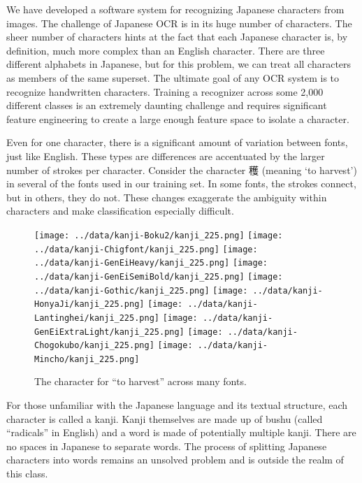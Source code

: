\documentclass[10pt,twocolumn,letterpaper]{article}
\begin{document}
We have developed a software system for recognizing Japanese characters from images. The challenge of Japanese OCR is in its huge number of characters. The sheer number of characters hints at the fact that each Japanese character is, by definition, much more complex than an English character. There are three different alphabets in Japanese, but for this problem, we can treat all characters as members of the same superset. The ultimate goal of any OCR system is to recognize handwritten characters. Training a recognizer across some 2,000 different classes is an extremely daunting challenge and requires significant feature engineering to create a large enough feature space to isolate a character.

Even for one character, there is a significant amount of variation between fonts, just like English. These types are differences are accentuated by the larger number of strokes per character. Consider the character 穫 (meaning ‘to harvest’) in several of the fonts used in our training set. In some fonts, the strokes connect, but in others, they do not. These changes exaggerate the ambiguity within characters and make classification especially difficult.

\begin{figure}[t]
    \centering
    \texttt{[image: ../data/kanji-Boku2/kanji\_225.png]}
    \texttt{[image: ../data/kanji-Chigfont/kanji\_225.png]}
    \texttt{[image: ../data/kanji-GenEiHeavy/kanji\_225.png]}
    \texttt{[image: ../data/kanji-GenEiSemiBold/kanji\_225.png]}
    \texttt{[image: ../data/kanji-Gothic/kanji\_225.png]}
    \texttt{[image: ../data/kanji-HonyaJi/kanji\_225.png]}
    \texttt{[image: ../data/kanji-Lantinghei/kanji\_225.png]}
    \texttt{[image: ../data/kanji-GenEiExtraLight/kanji\_225.png]}
    \texttt{[image: ../data/kanji-Chogokubo/kanji\_225.png]}
    \texttt{[image: ../data/kanji-Mincho/kanji\_225.png]}
    \caption{The character for ``to harvest'' across many fonts.}
\end{figure}

For those unfamiliar with the Japanese language and its textual structure, each character is called a kanji. Kanji themselves are made up of bushu (called ``radicals'' in English) and a word is made of potentially multiple kanji. There are no spaces in Japanese to separate words. The process of splitting Japanese characters into words remains an unsolved problem and is outside the realm of this class.
\end{document}
